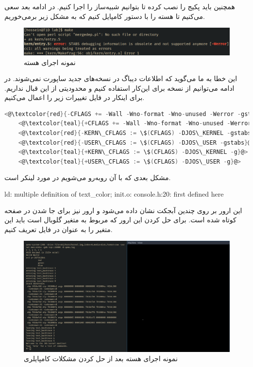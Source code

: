 \documentclass[a4paper, 12pt]{article}
\begin{document}
همچنین باید پکیج
را نصب کرده تا بتوانیم شبیه‌ساز
را اجرا کنیم.
در ادامه بعد سعی می‌کنیم تا هسته را با دستور
کامپایل کنیم که به مشکل زیر برمی‌خوریم.
\begin{figure}[H]
    \centering
    \includegraphics[width=1.0\textwidth]{2.png}
    \caption{نمونه اجرای هسته
    }
    \label{fig2:output}
\end{figure}
این خطا به ما می‌گوید که اطلاعات دیباگ
در نسخه‌های جدید
ساپورت نمی‌شوند.
در ادامه می‌توانیم از نسخه
برای این‌کار استفاده کنیم و محدودیتی از این قبال نداریم.
برای اینکار در فایل
تغییرات زیر را اعمال می‌کنیم.
\begin{latin}
\begin{lstlisting}[language=c]
    <@\textcolor{red}{-CFLAGS += -Wall -Wno-format -Wno-unused -Werror -gstabs -m32}@>
    <@\textcolor{teal}{+CFLAGS += -Wall -Wno-format -Wno-unused -Werror -g -m32}@>
    <@\textcolor{red}{-KERN\_CFLAGS := \$(CFLAGS) -DJOS\_KERNEL -gstabs}@>
    <@\textcolor{red}{-USER\_CFLAGS := \$(CFLAGS) -DJOS\_USER -gstabs}@>
    <@\textcolor{teal}{+KERN\_CFLAGS := \$(CFLAGS) -DJOS\_KERNEL -g}@>
    <@\textcolor{teal}{+USER\_CFLAGS := \$(CFLAGS) -DJOS\_USER -g}@>
\end{lstlisting}
\end{latin}
مشکل بعدی که با آن روبه‌رو می‌شویم در مورد لینکر است.
\begin{latin}
    ld: multiple definition of text\_color; init.o: console.h:20: first defined here
\end{latin}
این ارور بر روی چندین آبجکت نشان داده می‌شود و ارور نیز برای جا شدن در صفحه کوتاه شده است.
برای حل کردن این ارور که مربوط به متغیر گلوبال
است باید این متغیر را به عنوان
در فایل
تعریف کنیم.
\begin{figure}[H]
    \centering
    \includegraphics[width=1.0\textwidth]{3.png}
    \caption{نمونه اجرای هسته
    بعد از حل کردن مشکلات کامپایلری
    }
    \label{fig3:output}
\end{figure}
\end{document}
